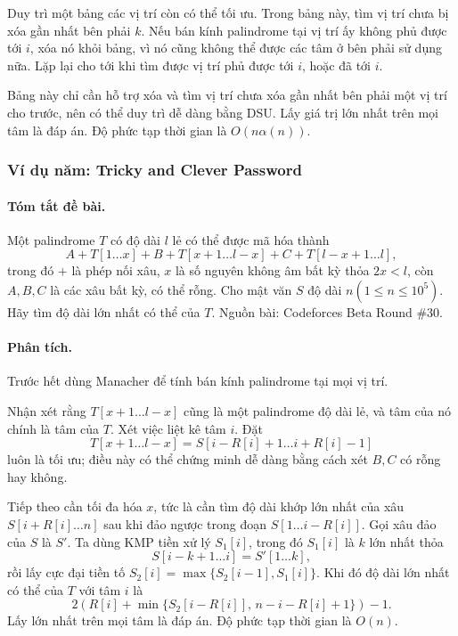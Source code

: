 \documentclass[11pt]{article}
\begin{document}
Duy trì một bảng các vị trí còn có thể tối ưu. Trong bảng này, tìm vị trí chưa
bị xóa gần nhất bên phải \(k\). Nếu bán kính palindrome tại vị trí ấy không phủ
được tới \(i\), xóa nó khỏi bảng, vì nó cũng không thể được các tâm ở bên phải
sử dụng nữa. Lặp lại cho tới khi tìm được vị trí phủ được tới \(i\), hoặc đã
tới \(i\).

Bảng này chỉ cần hỗ trợ xóa và tìm vị trí chưa xóa gần nhất bên phải một vị trí
cho trước, nên có thể duy trì dễ dàng bằng DSU. Lấy giá trị lớn nhất trên mọi
tâm là đáp án. Độ phức tạp thời gian là \(O(n\alpha(n))\).

\subsubsection{Ví dụ năm: Tricky and Clever Password}

\paragraph{Tóm tắt đề bài.}
Một palindrome \(T\) có độ dài \(l\) lẻ có thể được mã hóa thành
\[
  A+T[1\ldots x]+B+T[x+1\ldots l-x]+C+T[l-x+1\ldots l],
\]
trong đó \(+\) là phép nối xâu, \(x\) là số nguyên không âm bất kỳ thỏa
\(2x<l\), còn \(A,B,C\) là các xâu bất kỳ, có thể rỗng. Cho mật văn \(S\) độ dài
\(n(1\le n\le10^5)\). Hãy tìm độ dài lớn nhất có thể của \(T\). Nguồn bài:
Codeforces Beta Round \#30.

\paragraph{Phân tích.}
Trước hết dùng Manacher để tính bán kính palindrome tại mọi vị trí.

Nhận xét rằng \(T[x+1\ldots l-x]\) cũng là một palindrome độ dài lẻ, và tâm của
nó chính là tâm của \(T\). Xét việc liệt kê tâm \(i\). Đặt
\[
  T[x+1\ldots l-x]=S[i-R[i]+1\ldots i+R[i]-1]
\]
luôn là tối ưu; điều này có thể chứng minh dễ dàng bằng cách xét \(B,C\) có rỗng
hay không.

Tiếp theo cần tối đa hóa \(x\), tức là cần tìm độ dài khớp lớn nhất của xâu
\(S[i+R[i]\ldots n]\) sau khi đảo ngược trong đoạn \(S[1\ldots i-R[i]]\). Gọi
xâu đảo của \(S\) là \(S'\). Ta dùng KMP tiền xử lý \(S_1[i]\), trong đó
\(S_1[i]\) là \(k\) lớn nhất thỏa
\[
  S[i-k+1\ldots i]=S'[1\ldots k],
\]
rồi lấy cực đại tiền tố \(S_2[i]=\max\{S_2[i-1],S_1[i]\}\). Khi đó độ dài lớn
nhất có thể của \(T\) với tâm \(i\) là
\[
  2\left(R[i]+\min\{S_2[i-R[i]],\, n-i-R[i]+1\}\right)-1.
\]
Lấy lớn nhất trên mọi tâm là đáp án. Độ phức tạp thời gian là \(O(n)\).
\end{document}
